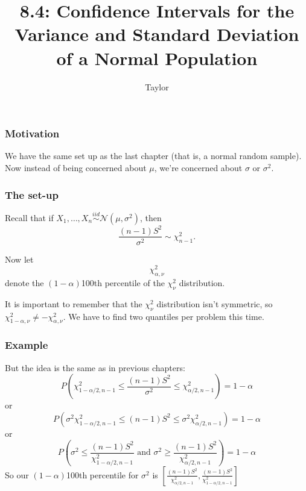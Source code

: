 \documentclass{beamer}
\title["8.4"]{8.4: Confidence Intervals for the Variance and Standard Deviation of a Normal Population}
\author{Taylor}
\institute[UVA] 
{
University of Virginia \\
\medskip
\textit{} 
}
\date{}
\begin{document}

\begin{frame}
\titlepage 
\end{frame}

\begin{frame}
\frametitle{Motivation}
 
We have the same set up as the last chapter (that is, a normal random sample). Now instead of being concerned about $\mu$, we're concerned about $\sigma$ or $\sigma^2$.

\end{frame}

\begin{frame}
\frametitle{The set-up}
 
Recall that if $X_1, \ldots, X_n \overset{iid}{\sim} \mathcal{N}(\mu, \sigma^2)$, then
\[
\frac{(n-1)S^2}{\sigma^2} \sim \chi^2_{n-1}.
\]

Now let 
\[
\chi^2_{\alpha, \nu}
\]
denote the $(1-\alpha)$100th percentile of the $\chi^2_{\nu}$ distribution.
\newline

It is important to remember that the $\chi^2_{\nu}$ distribution isn't symmetric, so $\chi^2_{1 - \alpha, \nu} \neq -\chi^2_{\alpha, \nu}$. We have to find two quantiles per problem this time.

\end{frame}


\begin{frame}
\frametitle{Example}

But the idea is the same as in previous chapters:
\[
P \left( \chi^2_{1 - \alpha/2, n-1} \le \frac{(n-1)S^2}{\sigma^2} \le \chi^2_{\alpha/2, n-1} \right) = 1- \alpha
\]
or
\[
P \left( \sigma^2 \chi^2_{1 - \alpha/2, n-1} \le (n-1)S^2 \le \sigma^2 \chi^2_{\alpha/2, n-1} \right) = 1- \alpha
\]
or
\[
P \left( \sigma^2  \le \frac{(n-1)S^2}{\chi^2_{1 - \alpha/2, n-1}} \text{  and  } \sigma^2 \ge \frac{(n-1)S^2}{\chi^2_{ \alpha/2, n-1}} \right) = 1- \alpha
\]
So our $(1-\alpha)$100th percentile for $\sigma^2$ is $\left[ \frac{(n-1)S^2}{\chi^2_{ \alpha/2, n-1}}, \frac{(n-1)S^2}{\chi^2_{1 - \alpha/2, n-1}} \right]$
\end{frame}
\end{document}
